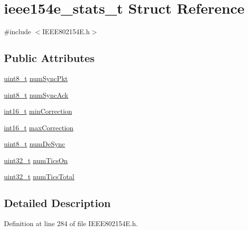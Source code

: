 \hypertarget{structieee154e__stats__t}{}\section{ieee154e\+\_\+stats\+\_\+t Struct Reference}
\label{structieee154e__stats__t}


{\ttfamily \#include $<$I\+E\+E\+E802154\+E.\+h$>$}

\subsection*{Public Attributes}
\begin{DoxyCompactItemize}
\item 
\hyperlink{_p_e___types_8h_aba7bc1797add20fe3efdf37ced1182c5}{uint8\+\_\+t} \hyperlink{structieee154e__stats__t_ae6a8a8754000cd5e54fd4aea5413acc5}{num\+Sync\+Pkt}
\item 
\hyperlink{_p_e___types_8h_aba7bc1797add20fe3efdf37ced1182c5}{uint8\+\_\+t} \hyperlink{structieee154e__stats__t_adf7c48b76a50cfb6a5bdb8af179a58cb}{num\+Sync\+Ack}
\item 
\hyperlink{_p_e___types_8h_a932e6ccc3d54c58f761c1aead83bd6d7}{int16\+\_\+t} \hyperlink{structieee154e__stats__t_a8253418a2af45a50377da92e7cc6a9de}{min\+Correction}
\item 
\hyperlink{_p_e___types_8h_a932e6ccc3d54c58f761c1aead83bd6d7}{int16\+\_\+t} \hyperlink{structieee154e__stats__t_a4f0a358ac0d4f89838ae2ef69ce380c1}{max\+Correction}
\item 
\hyperlink{_p_e___types_8h_aba7bc1797add20fe3efdf37ced1182c5}{uint8\+\_\+t} \hyperlink{structieee154e__stats__t_a3997879f2b9023357f6f522999353f7b}{num\+De\+Sync}
\item 
\hyperlink{_p_e___types_8h_a33594304e786b158f3fb30289278f5af}{uint32\+\_\+t} \hyperlink{structieee154e__stats__t_a7fceb45ff0d423b3d1b5515b300184e2}{num\+Tics\+On}
\item 
\hyperlink{_p_e___types_8h_a33594304e786b158f3fb30289278f5af}{uint32\+\_\+t} \hyperlink{structieee154e__stats__t_aabbf3a353c4f690dcb838b301b7f2fa6}{num\+Tics\+Total}
\end{DoxyCompactItemize}


\subsection{Detailed Description}


Definition at line 284 of file I\+E\+E\+E802154\+E.\+h.



